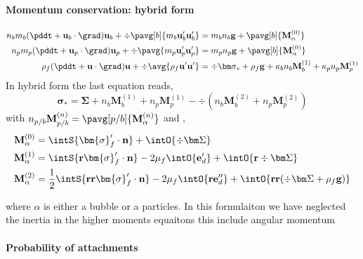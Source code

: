 \paragraph*{Momentum conservation: hybrid form}
\begin{align}
    n_b m_b (\pddt + \textbf{u}_b\cdot  \grad) \textbf{u}_b
    + \div \pavg[b]{ m_b \textbf{u}_b' \textbf{u}_b'}
    &= 
    m_b n_b \textbf{g}
    + \pavg[b]{\textbf{M}^{(0)}_\alpha}
    \\
    n_p m_p (\pddt + \textbf{u}_p\cdot  \grad) \textbf{u}_p
    + \div \pavg{ m_p \textbf{u}_p' \textbf{u}_p'}
    &= 
    m_p n_p \textbf{g}
    + \pavg[b]{\textbf{M}^{(0)}_\alpha}
    \\
    \rho_f (\pddt + \textbf{u} \cdot \grad)\textbf{u}
    + \div \avg{\rho_f \textbf{u}' \textbf{u}'}
    &= 
    \div \bm\sigma_*
    + \rho_f \textbf{g}
    +\kappa_b   n_b \textbf{M}_b^{(1)}
    +\kappa_p   n_p \textbf{M}_p^{(1)}
\end{align}
In hybrid form the last equation reads, 
\begin{equation}
    \bm\sigma_* 
    =
    \bm\Sigma
    +  n_b \textbf{M}_b^{(1)}
    +  n_p \textbf{M}_p^{(1)}
    -\div (  n_b \textbf{M}_b^{(2)}
    +  n_p \textbf{M}_p^{(2)})
\end{equation}
with $n_{p/b} \textbf{M}_{p/b}^{(n)} = \pavg[p/b]{\textbf{M}_\alpha^{(n)}}$ and , 
\begin{align}
    \textbf{M}_\alpha^{(0)} &=
    \intS{\bm{\sigma}_f' \cdot \textbf{n}}
   +\intO{\div \bm\Sigma}
   \\
   \textbf{M}_\alpha^{(1)} &=
   \intS{\textbf{r}\bm{\sigma}_f' \cdot \textbf{n}}
   -2\mu_f \intO{\textbf{e}_d'}
   +\intO{\textbf{r}\div \bm\Sigma}
   \\
   \textbf{M}_\alpha^{(2)} &=
   \frac{1}{2}\intS{\textbf{rr}\bm{\sigma}_f' \cdot \textbf{n}}
   -2\mu_f \intO{\textbf{re}_d''}
   +\intO{\textbf{rr}(\div \bm\Sigma+ \rho_f\textbf{g})}
    \\
\end{align}

where $\alpha$ is either a bubble or a particles. 
In this formulaiton we have neglected the inertia in the higher moments equaitons this include angular momentum 

\paragraph*{Probability of attachments }


